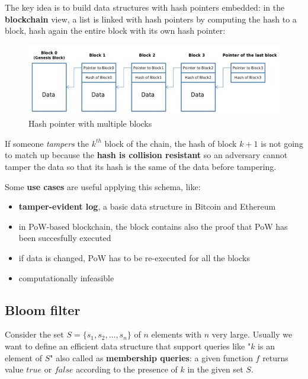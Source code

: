 \documentclass[10pt,a4paper]{report}
\begin{document}
The key idea is to build data structures with hash pointers embedded: in the \textbf{blockchain} view, a list is linked with hash pointers by computing the hash to a block, hash again the entire block with its own hash pointer:
\begin{figure}
	\centering
	\includegraphics[scale=0.50]{images/Pasted image 20230317160103.png}
	\caption{Hash pointer with multiple blocks}
\end{figure}

If someone \textit{tampers} the $k^{th}$ block of the chain, the hash of block $k+1$ is not going to match up because the \textbf{hash is collision resistant} so an adversary cannot tamper the data so that its hash is the same of the data before tampering.

Some \textbf{use cases} are useful applying this schema, like:
\begin{itemize}
	\item 
	\textbf{tamper-evident log}, a basic data structure in Bitcoin and Ethereum
	\item 
	in PoW-based blockchain, the block contains also the proof that PoW has been succesfully executed
	\item 
	if data is changed, PoW has to be re-executed for all the blocks
	\item 
	computationally infeasible
\end{itemize}
\subsection{Bloom filter}\label{sec:2-bloom-filter}
Consider the set $S = \{s_{1}, s_{2}, ..., s_{n}\}$ of $n$ elements with $n$ very large. Usually we want to define an efficient data structure that support queries like "$k$ is an element of $S$" also called as \textbf{membership queries}: a given function $f$ returns value $true$ or $false$ according to the presence of $k$ in the given set $S$.
\end{document}
